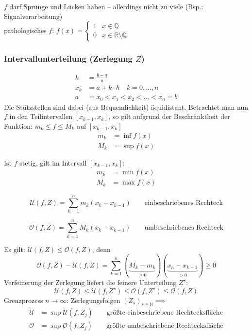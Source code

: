 \noindent \( f \) darf Sprünge und Lücken haben -- allerdings nicht zu viele (Bsp.: Signalverarbeitung) \\
pathologisches \( f \): \( f(x) = \begin{cases}1 & x \in \mathbb{Q} \\ 0 & x \in \mathbb{R} \setminus \mathbb{Q}\end{cases} \)

\subsubsection*{Intervallunterteilung (Zerlegung $Z$)}

\begin{align*}
	h &= \frac{b-a}{n} \\
	x_k &= a+k \cdot h \quad k=0,\ldots,n \\
	a &= x_0<x_1<x_2<\ldots<x_n=b 
\end{align*}
Die Stützstellen sind dabei (aus Bequemlichkeit) äquidistant. Betrachtet man nun \(f\) in den Teilintervallen \( [x_{k-1},x_k] \), so gilt aufgrund der Beschränktheit der Funktion: \( m_k \leq f \leq M_k \) auf \( [x_{k-1},x_k] \)
\begin{align*}
	m_k &= \inf f(x) \\
	M_k &= \sup f(x)
\end{align*}

\begin{note}
	Ist \( f \) stetig, gilt im Intervall \( [x_{k-1},x_k] \):
	\begin{align*}
		m_k &= \min f(x) \\
		M_k &= \max f(x)
	\end{align*}	
\end{note}

\begin{definition}
	\[
		\mathcal U(f, Z)= \sum_{k=1}^nm_k(x_k-x_{k-1}) \qquad \text{einbeschriebenes Rechteck}
	\]
\end{definition}


\begin{definition}
	\[
		\mathcal O(f, Z)= \sum_{k=1}^nM_k(x_k-x_{k-1})  \qquad \text{umbeschriebenes Rechteck}
	\]
\end{definition}

\noindent Es gilt: \( \mathcal U(f,Z) \leq \mathcal O(f,Z) \), denn
	\[ \mathcal O(f,Z)- \mathcal U(f,Z)=\sum_{k=1}^n(\underbrace{M_k-m_k}_{\geq0})(\underbrace{x_n-x_{k-1}}_{>0}) \geq 0 \]
\noindent Verfeinerung der Zerlegung liefert die feinere Unterteilung \( Z^\star \):
	\[ \mathcal U(f,Z) \leq \mathcal U(f, Z^\star) \leq \mathcal O(f,Z^\star) \leq \mathcal O(f,Z) \]
\noindent Grenzprozess \( n \rightarrow \infty \): Zerlegungsfolgen \( (Z_s)_{s\in\mathbb{N}} \implies \) 
	\begin{align*}
		\mathcal U &= \sup \mathcal U(f,Z_j) \qquad \text{größte einbeschriebene Rechtecksfläche}\\
		\mathcal O &= \sup \mathcal O(f,Z_j) \qquad \text{größte umbeschriebene Rechtecksfläche}
	\end{align*}

